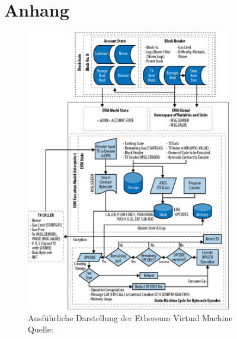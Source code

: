 
\appendix
\chapter{Anhang}
\begin{figure}[htpb]
	\centering
	\includegraphics[width=0.8\textwidth]{images/evm_full.png}
	\caption{Ausführliche Darstellung der Ethereum Virtual Machine\\
	Quelle: \cite[S. 414]{antanopoulos_2018}}
	\label{6braun:fig:EVM_full}
\end{figure}